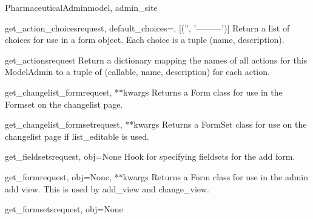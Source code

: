 \documentclass[letterpaper,10pt,english]{sphinxmanual}
\begin{document}
\begin{classdesc}{PharmaceuticalAdmin}{model, admin\_site}
\hypertarget{data.admin.PharmaceuticalAdmin.get_action_choices}{}\begin{methoddesc}{get\_action\_choices}{request, default\_choices=, {[}('', '---------'){]}}
Return a list of choices for use in a form object.  Each choice is a
tuple (name, description).
\end{methoddesc}

\hypertarget{data.admin.PharmaceuticalAdmin.get_actions}{}\begin{methoddesc}{get\_actions}{request}
Return a dictionary mapping the names of all actions for this
ModelAdmin to a tuple of (callable, name, description) for each action.
\end{methoddesc}

\hypertarget{data.admin.PharmaceuticalAdmin.get_changelist_form}{}\begin{methoddesc}{get\_changelist\_form}{request, **kwargs}
Returns a Form class for use in the Formset on the changelist page.
\end{methoddesc}

\hypertarget{data.admin.PharmaceuticalAdmin.get_changelist_formset}{}\begin{methoddesc}{get\_changelist\_formset}{request, **kwargs}
Returns a FormSet class for use on the changelist page if list\_editable
is used.
\end{methoddesc}

\hypertarget{data.admin.PharmaceuticalAdmin.get_fieldsets}{}\begin{methoddesc}{get\_fieldsets}{request, obj=None}
Hook for specifying fieldsets for the add form.
\end{methoddesc}

\hypertarget{data.admin.PharmaceuticalAdmin.get_form}{}\begin{methoddesc}{get\_form}{request, obj=None, **kwargs}
Returns a Form class for use in the admin add view. This is used by
add\_view and change\_view.
\end{methoddesc}

\hypertarget{data.admin.PharmaceuticalAdmin.get_formsets}{}\begin{methoddesc}{get\_formsets}{request, obj=None}\end{methoddesc}


\end{classdesc}
\end{document}
